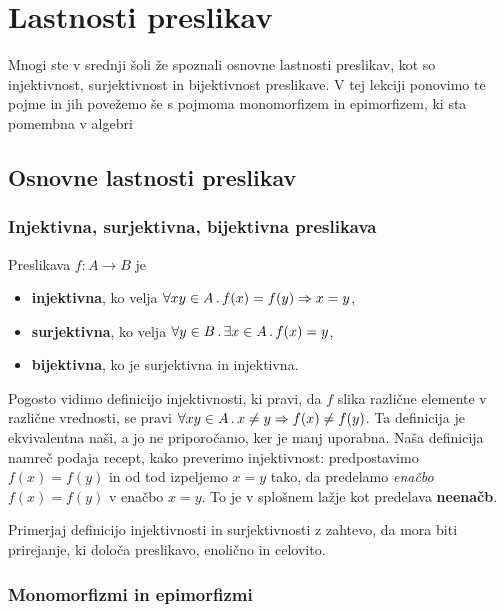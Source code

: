 \chapter{Lastnosti preslikav}

Mnogi ste v srednji šoli že spoznali osnovne lastnosti preslikav, kot so injektivnost, surjektivnost in bijektivnost preslikave. V tej lekciji ponovimo te pojme in jih povežemo še s pojmoma monomorfizem in epimorfizem, ki sta pomembna v algebri

\section{Osnovne lastnosti preslikav}

\subsection{Injektivna, surjektivna, bijektivna preslikava}

\begin{definicija}
  Preslikava $f : A \to B$ je
  \begin{itemize}
  \item \textbf{injektivna}, ko velja $\forall x y \in A \,.\, f(x) = f(y) \Rightarrow x = y$,
  \item \textbf{surjektivna}, ko velja $\forall y \in B \,.\, \exists x \in A \,.\, f(x) = y$,
  \item \textbf{bijektivna}, ko je surjektivna in injektivna.
  \end{itemize}
\end{definicija}

\begin{opomba}
  Pogosto vidimo definicijo injektivnosti, ki pravi, da $f$ slika različne elemente v različne vrednosti, se pravi $\forall x y \in A \,.\, x \neq y \Rightarrow f(x) \neq f(y)$. Ta definicija je ekvivalentna naši, a jo ne priporočamo, ker je manj uporabna.
  Naša definicija namreč podaja recept, kako preverimo injektivnost: predpostavimo $f(x) = f(y)$ in od tod izpeljemo
  $x = y$ tako, da predelamo \emph{enačbo} $f(x) = f(y)$ v enačbo $x = y$. To je v splošnem lažje kot predelava \textbf{neenačb}.
\end{opomba}

\begin{naloga}
  Primerjaj definicijo injektivnosti in surjektivnosti z zahtevo, da mora biti prirejanje, ki določa preslikavo, enolično in celovito.
\end{naloga}


\subsection{Monomorfizmi in epimorfizmi}

